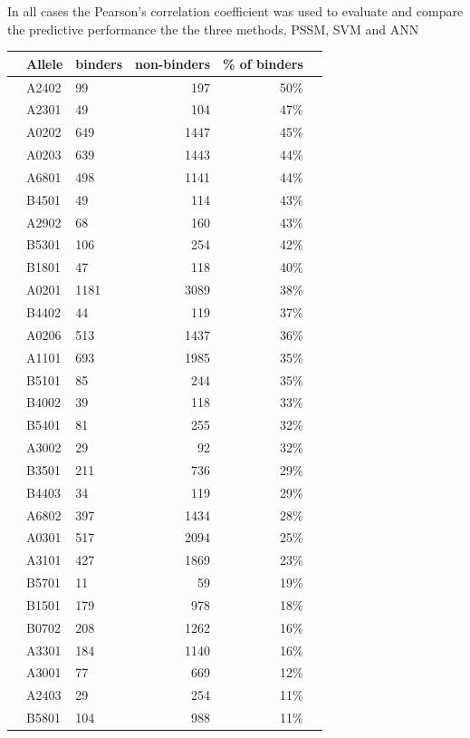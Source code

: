 
In all cases the Pearson's correlation coefficient was used to evaluate and compare the predictive performance the the three methods, PSSM, SVM and ANN

\begin{table}[ht]\scriptsize
\begin{center}
\begin{tabular}{rllrrr}
\hline
 & Allele	&	 binders & non-binders & \% of binders \\
\hline
 & A2402	&	99	&	197	&	50\%	\\
 & A2301	&	49	&	104	&	47\%	\\
 & A0202	&	649	&	1447	&	45\%	\\
 & A0203	&	639	&	1443	&	44\%	\\
 & A6801	&	498	&	1141	&	44\%	\\
 & B4501	&	49	&	114	&	43\%	\\
 & A2902	&	68	&	160	&	43\%	\\
 & B5301	&	106	&	254	&	42\%	\\
 & B1801	&	47	&	118	&	40\%	\\
 & A0201	&	1181	&	3089	&	38\%	\\
 & B4402	&	44	&	119	&	37\%	\\
 & A0206	&	513	&	1437	&	36\%	\\
 & A1101	&	693	&	1985	&	35\%	\\
 & B5101	&	85	&	244	&	35\%	\\
 & B4002	&	39	&	118	&	33\%	\\
 & B5401	&	81	&	255	&	32\%	\\
 & A3002	&	29	&	92	&	32\%	\\
 & B3501	&	211	&	736	&	29\%	\\
 & B4403	&	34	&	119	&	29\%	\\
 & A6802	&	397	&	1434	&	28\%	\\
 & A0301	&	517	&	2094	&	25\%	\\
 & A3101	&	427	&	1869	&	23\%	\\
 & B5701	&	11	&	59	&	19\%	\\
 & B1501	&	179	&	978	&	18\%	\\
 & B0702	&	208	&	1262	&	16\%	\\
 & A3301	&	184	&	1140	&	16\%	\\
 & A3001	&	77	&	669	&	12\%	\\
 & A2403	&	29	&	254	&	11\%	\\
 & B5801	&	104	&	988	&	11\%	\\

\end{tabular}
\end{center}
\end{table}
